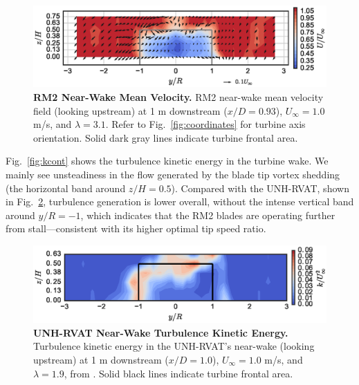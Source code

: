 \documentclass[10pt,letterpaper]{article}
\begin{document}
\begin{figure}
    \includegraphics[width=\textwidth]{figures/meancontquiv.eps}

    \caption{{\bf RM2 Near-Wake Mean Velocity.} RM2 near-wake mean velocity
        field (looking upstream) at 1 m downstream ($x/D=0.93$), $U_\infty=1.0$ m/s,
        and $\lambda=3.1$. Refer to Fig.~\ref{fig:coordinates} for turbine axis
        orientation. Solid dark gray lines indicate turbine frontal area.}

    \label{fig:meancontquiv}
\end{figure}

Fig.~\ref{fig:kcont} shows the turbulence kinetic energy in the turbine wake. We
mainly see unsteadiness in the flow generated by the blade tip vortex shedding
(the horizontal band around $z/H=0.5$). Compared with the UNH-RVAT, shown in
Fig.~\ref{fig:rvat-kcont}, turbulence generation is lower overall, without the
intense vertical band around $y/R=-1$, which indicates that the RM2 blades are
operating further from stall---consistent with its higher optimal tip speed
ratio.

\begin{figure}
    \includegraphics[width=\textwidth]{figures/RVAT-Re-dep-k_contours_10.eps}
    
    \caption{{\bf UNH-RVAT Near-Wake Turbulence Kinetic Energy.} Turbulence
        kinetic energy in the UNH-RVAT's near-wake (looking upstream) at 1 m
        downstream ($x/D=1.0$), $U_\infty=1.0$ m/s, and $\lambda=1.9$, from
        \cite{Bachant2016-Energies}. Solid black lines indicate turbine frontal
        area.}
    
    \label{fig:rvat-kcont}
\end{figure}
\end{document}

